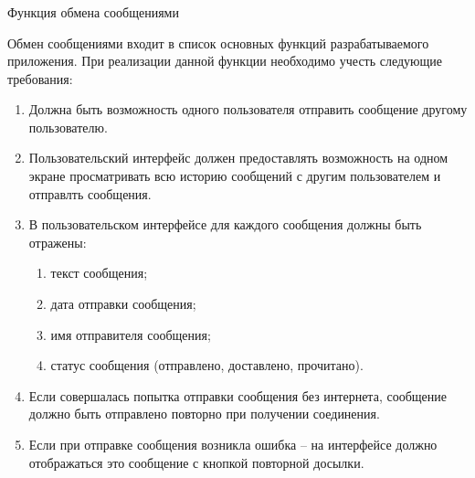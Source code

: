 \subsubsection{} Функция обмена сообщениями
\label{sec:analysis:research:funcreq:messages}

Обмен сообщениями входит в список основных функций разрабатываемого приложения. При реализации данной функции необходимо учесть следующие требования:

\begin{enumerate}
	\item Должна быть возможность одного пользователя отправить сообщение другому пользователю.
	\item Пользовательский интерфейс должен предоставлять возможность на одном экране просматривать всю историю сообщений с другим пользователем и отправлть сообщения.
	\item В пользовательском интерфейсе для каждого сообщения должны быть отражены:
	\begin{enumerate}
		\item текст сообщения;
		\item дата отправки сообщения;
		\item имя отправителя сообщения;
		\item статус сообщения (отправлено, доставлено, прочитано).
	\end{enumerate}
	\item Если совершалась попытка отправки сообщения без интернета, сообщение должно быть отправлено повторно при получении соединения.
	\item Если при отправке сообщения возникла ошибка -- на интерфейсе должно отображаться это сообщение с кнопкой повторной досылки.
\end{enumerate}
